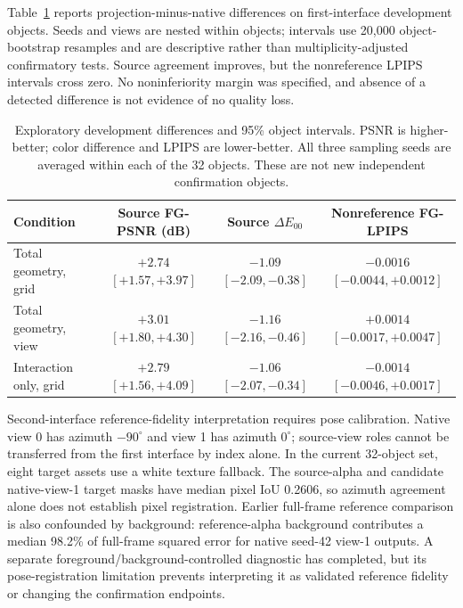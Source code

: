 \documentclass[11pt]{article}
\begin{document}
Table~\ref{tab:development012} reports projection-minus-native differences on
first-interface development objects. Seeds and views are nested within objects;
intervals use 20,000 object-bootstrap resamples and are descriptive rather than
multiplicity-adjusted confirmatory tests. Source agreement improves, but the
nonreference LPIPS intervals cross zero. No noninferiority margin was specified,
and absence of a detected difference is not evidence of no quality loss.

\begin{table}[ht]
\centering\scriptsize
\begin{tabular}{lccc}
\toprule
Condition & Source FG-PSNR (dB) & Source $\Delta E_{00}$ & Nonreference FG-LPIPS \\
\midrule
Total geometry, grid & $+2.74$ $[+1.57,+3.97]$ & $-1.09$ $[-2.09,-0.38]$ & $-0.0016$ $[-0.0044,+0.0012]$ \\
Total geometry, view & $+3.01$ $[+1.80,+4.30]$ & $-1.16$ $[-2.16,-0.46]$ & $+0.0014$ $[-0.0017,+0.0047]$ \\
Interaction only, grid & $+2.79$ $[+1.56,+4.09]$ & $-1.06$ $[-2.07,-0.34]$ & $-0.0014$ $[-0.0046,+0.0017]$ \\
\bottomrule
\end{tabular}
\caption{Exploratory development differences and 95\% object intervals.
PSNR is higher-better; color difference and LPIPS are lower-better. All three
sampling seeds are averaged within each of the 32 objects. These are not new
independent confirmation objects.}
\label{tab:development012}
\end{table}

Second-interface reference-fidelity interpretation requires pose calibration. Native
view 0 has azimuth $-90^\circ$ and view 1 has azimuth $0^\circ$; source-view roles
cannot be transferred from the first interface by index alone. In the current
32-object set, eight target assets use a white texture fallback. The source-alpha
and candidate native-view-1 target masks have median pixel IoU 0.2606, so azimuth
agreement alone does not establish pixel registration. Earlier full-frame
reference comparison is also confounded by background: reference-alpha
background contributes a median 98.2\% of full-frame squared error for native
seed-42 view-1 outputs. A separate foreground/background-controlled diagnostic
has completed, but its pose-registration limitation prevents interpreting it as
validated reference fidelity or changing the confirmation endpoints.
\end{document}
